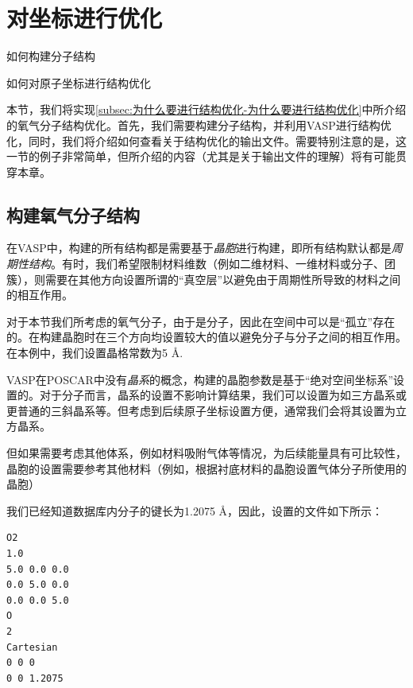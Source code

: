 \section{对坐标进行优化}\label{sec:对坐标进行优化ISIF=2}

\begin{Abstract}
    \item 如何构建分子结构
    \item 如何对原子坐标进行结构优化
\end{Abstract}

本节，我们将实现\ref{subsec:为什么要进行结构优化-为什么要进行结构优化}中所介绍的氧气分子结构优化。首先，我们需要构建分子结构，并利用VASP进行结构优化，同时，我们将介绍如何查看关于结构优化的输出文件。需要特别注意的是，这一节的例子非常简单，但所介绍的内容（尤其是关于输出文件的理解）将有可能贯穿本章。

\subsection{构建氧气分子结构}\label{subsec:对坐标进行优化ISIF=2-构建氧气分子结构}

在VASP中，构建的所有结构都是需要基于\emph{晶胞}进行构建，即所有结构默认都是\emph{周期性结构}。有时，我们希望限制材料维数（例如二维材料、一维材料或分子、团簇），则需要在其他方向设置所谓的“真空层”以避免由于周期性所导致的材料之间的相互作用。

对于本节我们所考虑的氧气分子，由于是分子，因此在空间中可以是“孤立”存在的。在构建晶胞时在三个方向均设置较大的值以避免分子与分子之间的相互作用。在本例中，我们设置晶格常数为5 Å.

\begin{attention}
    VASP在POSCAR中没有\emph{晶系}的概念，构建的晶胞参数是基于“绝对空间坐标系”设置的。对于分子而言，晶系的设置不影响计算结果，我们可以设置为如三方晶系或更普通的三斜晶系等。但考虑到后续原子坐标设置方便，通常我们会将其设置为立方晶系。

    但如果需要考虑其他体系，例如材料吸附气体等情况，为后续能量具有可比较性，晶胞的设置需要参考其他材料（例如，根据衬底材料的晶胞设置气体分子所使用的晶胞）
\end{attention}

我们已经知道数据库内分子的键长为1.2075 Å，因此，设置的文件如下所示：

\begin{lstlisting}[caption=POSCAR]
O2
1.0
5.0 0.0 0.0
0.0 5.0 0.0
0.0 0.0 5.0
O
2
Cartesian
0 0 0
0 0 1.2075
\end{lstlisting}

